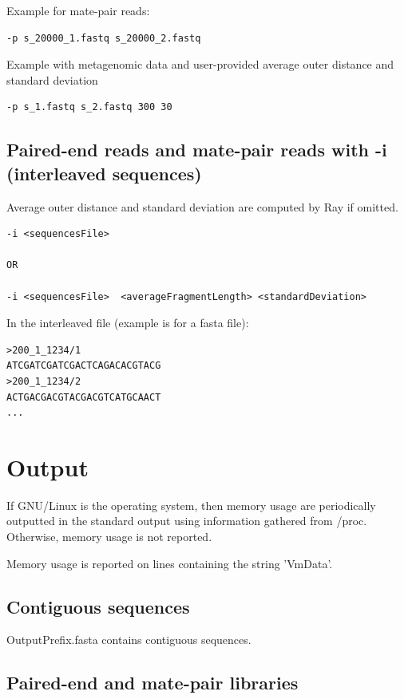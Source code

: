 \documentclass{article}
\begin{document}
Example for mate-pair reads:

\begin{verbatim}
-p s_20000_1.fastq s_20000_2.fastq
\end{verbatim}

Example with metagenomic data and user-provided average outer distance and standard deviation

\begin{verbatim}
-p s_1.fastq s_2.fastq 300 30
\end{verbatim}

\subsection{Paired-end reads and mate-pair reads with -i (interleaved sequences)}


Average outer distance and standard deviation are computed by Ray if omitted.

\begin{verbatim}
-i <sequencesFile>

OR

-i <sequencesFile>  <averageFragmentLength> <standardDeviation> 
\end{verbatim}

In the interleaved file (example is for a fasta file):

\begin{verbatim}
>200_1_1234/1
ATCGATCGATCGACTCAGACACGTACG
>200_1_1234/2
ACTGACGACGTACGACGTCATGCAACT
...
\end{verbatim}



\section{Output}

If GNU/Linux is the operating system, then memory usage are periodically outputted in the 
standard output using information gathered from /proc. Otherwise, memory usage is not reported.

Memory usage is reported on lines containing the string 'VmData'.

\subsection{Contiguous sequences}

OutputPrefix.fasta contains contiguous sequences.

\subsection{Paired-end and mate-pair libraries}
\end{document}
